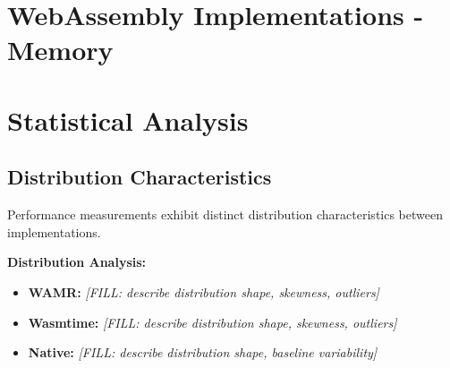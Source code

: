 











\section{WebAssembly Implementations - Memory}
\label{sec:wasm-memory}

\section{Statistical Analysis}
\label{sec:statistical-analysis}

\subsection{Distribution Characteristics}
\label{subsec:distribution-analysis}

Performance measurements exhibit distinct distribution characteristics between implementations. 


\textbf{Distribution Analysis:}
\begin{itemize}
    \item \textbf{WAMR:} \textit{[FILL: describe distribution shape, skewness, outliers]}
    \item \textbf{Wasmtime:} \textit{[FILL: describe distribution shape, skewness, outliers]}
    \item \textbf{Native:} \textit{[FILL: describe distribution shape, baseline variability]}
\end{itemize}

